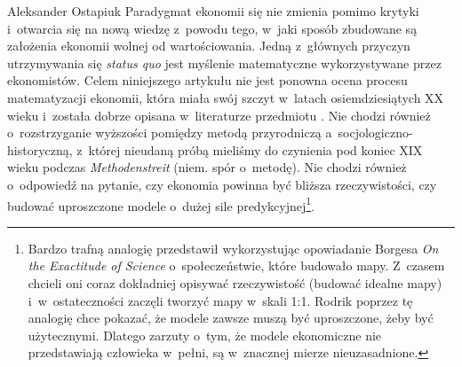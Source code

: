 \begin{artplenv}{Aleksander Ostapiuk}
Paradygmat ekonomii się nie zmienia pomimo krytyki i~otwarcia się na nową wiedzę z~powodu tego, w~jaki sposób zbudowane
są założenia ekonomii wolnej od wartościowania. Jedną z~głównych przyczyn utrzymywania się \textit{status quo }jest
myślenie matematyczne wykorzystywane przez ekonomistów. Celem niniejszego artykułu nie jest ponowna ocena procesu
matematyzacji ekonomii, która miała swój szczyt w~latach osiemdziesiątych XX wieku i~została dobrze
opisana w~literaturze przedmiotu
\parencite{beed_what_1991,debreu_mathematization_1991,weintraub_how_2002,mirowski_machine_2002,ostapiuk_matematyzacja_2017}.
Nie chodzi również o~rozstrzyganie wyższości pomiędzy metodą przyrodniczą
a~socjologiczno-historyczną, z~której nieudaną próbą mieliśmy do czynienia pod koniec XIX wieku podczas
\textit{Methodenstreit} (niem. spór o~metodę). Nie chodzi również o~odpowiedź na pytanie, czy ekonomia powinna być
bliższa rzeczywistości, czy budować uproszczone modele o~dużej sile predykcyjnej\footnote{Bardzo trafną analogię
przedstawił
\parencite[s.~43–44]{rodrik_economics_2015}
wykorzystując opowiadanie Borgesa \textit{On the
Exactitude of Science} o~społeczeństwie, które budowało mapy. Z~czasem chcieli oni coraz dokładniej opisywać
rzeczywistość (budować idealne mapy) i~w~ostateczności zaczęli tworzyć mapy w~skali 1:1. Rodrik poprzez tę analogię
chce pokazać, że modele zawsze muszą być uproszczone, żeby być użytecznymi. Dlatego zarzuty o~tym, że modele
ekonomiczne nie przedstawiają człowieka w~pełni, są w~znacznej mierze nieuzasadnione.}.


\end{artplenv}

